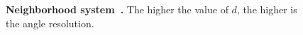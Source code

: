 \begin{figure}
\center
{}\hspace{2em}
\caption{\textbf{Neighborhood system~\cite{nieuwenhuis14efficient}.} The higher the value of $d$, the higher is the angle resolution.}
\label{ch3:fig:nieuweinhuis-neighborhood}
\end{figure}

